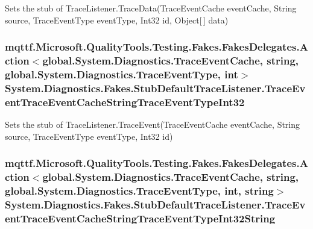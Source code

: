 Sets the stub of Trace\-Listener.\-Trace\-Data(\-Trace\-Event\-Cache event\-Cache, String source, Trace\-Event\-Type event\-Type, Int32 id, Object\mbox{[}$\,$\mbox{]} data)

\hypertarget{class_system_1_1_diagnostics_1_1_fakes_1_1_stub_default_trace_listener_af250c2b1a35db89f5fef1002771cc51b}{
\subsubsection[{Trace\-Event\-Trace\-Event\-Cache\-String\-Trace\-Event\-Type\-Int32}]{\setlength{\rightskip}{0pt plus 5cm}mqttf.\-Microsoft.\-Quality\-Tools.\-Testing.\-Fakes.\-Fakes\-Delegates.\-Action$<$global.\-System.\-Diagnostics.\-Trace\-Event\-Cache, string, global.\-System.\-Diagnostics.\-Trace\-Event\-Type, int$>$ System.\-Diagnostics.\-Fakes.\-Stub\-Default\-Trace\-Listener.\-Trace\-Event\-Trace\-Event\-Cache\-String\-Trace\-Event\-Type\-Int32}}\label{class_system_1_1_diagnostics_1_1_fakes_1_1_stub_default_trace_listener_af250c2b1a35db89f5fef1002771cc51b}


Sets the stub of Trace\-Listener.\-Trace\-Event(\-Trace\-Event\-Cache event\-Cache, String source, Trace\-Event\-Type event\-Type, Int32 id)

\hypertarget{class_system_1_1_diagnostics_1_1_fakes_1_1_stub_default_trace_listener_a25816bc305b3b6c09a8b4e4d6edd8cb9}{
\subsubsection[{Trace\-Event\-Trace\-Event\-Cache\-String\-Trace\-Event\-Type\-Int32\-String}]{\setlength{\rightskip}{0pt plus 5cm}mqttf.\-Microsoft.\-Quality\-Tools.\-Testing.\-Fakes.\-Fakes\-Delegates.\-Action$<$global.\-System.\-Diagnostics.\-Trace\-Event\-Cache, string, global.\-System.\-Diagnostics.\-Trace\-Event\-Type, int, string$>$ System.\-Diagnostics.\-Fakes.\-Stub\-Default\-Trace\-Listener.\-Trace\-Event\-Trace\-Event\-Cache\-String\-Trace\-Event\-Type\-Int32\-String}}\label{class_system_1_1_diagnostics_1_1_fakes_1_1_stub_default_trace_listener_a25816bc305b3b6c09a8b4e4d6edd8cb9}


